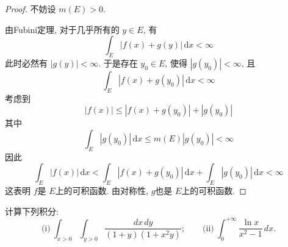 \documentclass[../main.tex]{subfiles}
\begin{document}
\begin{proof}
    不妨设 \(  m\left( E \right)> 0   \).

    由Fubini定理,  对于几乎所有的 \(  y\in E  \), 有 \[
   \int_{E}\left| f\left( x \right)+ g\left( y \right)   \right|\,\mathrm{d} x< \infty 
   \] 此时必然有 \(  \left| g\left( y \right)  \right|< \infty   \). 于是存在  \(  y_0\in E  \), 使得 \(  \left| g\left( y_0 \right)  \right|< \infty   \), 且 \[
   \int_{E}\left| f\left( x \right)+ g\left( y_0 \right)   \right|\,\mathrm{d} x< \infty 
   \]考虑到 \[
    \left| f\left( x \right)  \right| \le \left| f\left( x \right)+ g\left( y_0 \right)   \right|+ \left| g\left( y_0 \right)  \right|  
    \] 其中 \[
    \int_{E}\left| g\left( y_0 \right)  \right|\,\mathrm{d} x \le m\left( E \right)\left| g\left( y_0 \right)  \right|< \infty   
    \]因此 \[
    \int_{E}\left| f\left( x \right)  \right|\,\mathrm{d} x< \int_{E}\left| f\left( x \right)+ g\left( y_0 \right)   \right|\,\mathrm{d} x+ \int_{E}\left| g\left( y_0 \right)  \right|\,\mathrm{d}  x < \infty   
    \]这表明 \(  f  \)是 \(  E  \)上的可积函数. 由对称性, \(  g  \)也是 \(  E  \)上的可积函数.    
\end{proof}
\begin{exercise}{}{}
 计算下列积分:
\[
\text{(i)}\ \int_{x>0}\int_{y>0}\frac{dx\,dy}{(1+y)(1+x^{2}y)};\qquad
\text{(ii)}\ \int_{0}^{+\infty}\frac{\ln x}{x^{2}-1}\,dx.
\]
\end{exercise}
\end{document}
